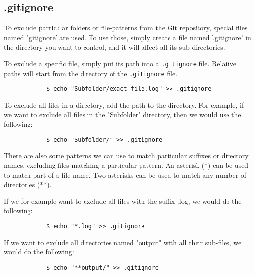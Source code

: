 \documentclass[../main/git_course_main.tex]{subfiles}
\begin{document}
	\subsection{.gitignore}
	
	To exclude particular folders or file-patterns from the Git repository, special files named '.gitignore' are used.
	To use those, simply create a file named '.gitignore' in the directory you want to control, and it will affect all its sub-directories.
	
	To exclude a specific file, simply put its path into a \verb$.gitignore$ file.
	Relative paths will start from the directory of the \verb$.gitignore$ file.
	
	\begin{codebox}
		\begin{lstlisting}
			$ echo "Subfolder/exact_file.log" >> .gitignore
		\end{lstlisting}
	\end{codebox}
	
	To exclude all files in a directory, add the path to the directory.
	For example, if we want to exclude all files in the "Subfolder" directory, then we would use the following:
	
	\begin{codebox}
		\begin{lstlisting}
			$ echo "Subfolder/" >> .gitignore
		\end{lstlisting}
	\end{codebox}
	
	There are also some patterns we can use to match particular suffixes or directory names, excluding files matching a particular pattern. An asterisk (*) can be used to match part of a file name. Two asterisks can be used to match any number of directories (**).
	
	If we for example want to exclude all files with the suffix .log, we would do the following:
	
	\begin{codebox}
		\begin{lstlisting}
			$ echo "*.log" >> .gitignore
		\end{lstlisting}
	\end{codebox}
	
	If we want to exclude all directories named "output" with all their sub-files, we would do the following:
	
	\begin{codebox}
		\begin{lstlisting}
			$ echo "**output/" >> .gitignore
		\end{lstlisting}
	\end{codebox}
	
\end{document}
